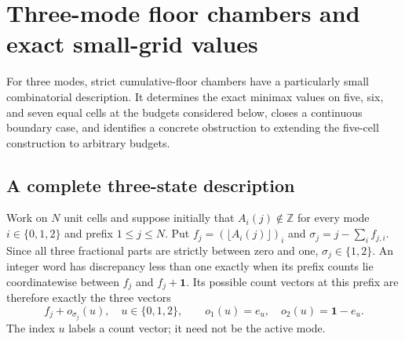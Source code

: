 \section{Three-mode floor chambers and exact small-grid values}\label{sec:floor-chambers}
For three modes, strict cumulative-floor chambers have a particularly small
combinatorial description. It determines the exact minimax values on five,
six, and seven equal cells at the budgets considered below, closes a
continuous boundary case, and identifies a concrete obstruction to extending
the five-cell construction to arbitrary budgets.

\subsection{A complete three-state description}
Work on $N$ unit cells and suppose initially that $A_i(j)\notin\mathbb Z$
for every mode $i\in\{0,1,2\}$ and prefix $1\le j\le N$. Put
$f_j=(\lfloor A_i(j)\rfloor)_i$ and
$\sigma_j=j-\sum_i f_{j,i}$. Since all three fractional parts are strictly
between zero and one, $\sigma_j\in\{1,2\}$. An integer word has discrepancy
less than one exactly when its prefix counts lie coordinatewise between
$f_j$ and $f_j+\mathbf1$. Its possible count vectors at this prefix are
therefore exactly the three vectors
\begin{equation}\label{eq:floor-offset}
 f_j+o_{\sigma_j}(u),\quad u\in\{0,1,2\},\qquad
 o_1(u)=e_u,\quad o_2(u)=\mathbf1-e_u.
\end{equation}
The index $u$ labels a count vector; it need not be the active mode.

